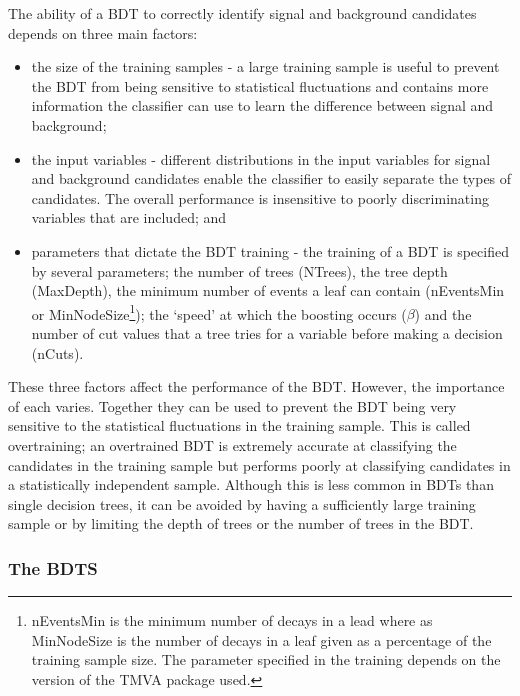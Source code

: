 The ability of a BDT to correctly identify signal and background candidates depends on three main factors:
\begin{itemize}
\item the size of the training samples - a large training sample is useful to prevent the BDT from being sensitive to statistical fluctuations and contains more information the classifier can use to learn the difference between signal and background;
\item the input variables - different distributions in the input variables for signal and background candidates enable the classifier to easily separate the types of candidates. The overall performance is insensitive to poorly discriminating variables that are included; and
\item parameters that dictate the BDT training - the training of a BDT is specified by several parameters; the number of trees (NTrees), the tree depth (MaxDepth), the minimum number of events a leaf can contain (nEventsMin or MinNodeSize\footnote{nEventsMin is the minimum number of decays in a lead where as MinNodeSize is the number of decays in a leaf given as a percentage of the training sample size. The parameter specified in the training depends on the version of the TMVA package used. }); the `speed’ at which the boosting occurs ($\beta$) and the number of cut values that a tree tries for a variable before making a decision (nCuts).
\end{itemize}

These three factors affect the performance of the BDT. However, the importance of each varies. Together they can be used to prevent the BDT being very sensitive to the statistical fluctuations in the training sample. This is called overtraining; an overtrained BDT is extremely accurate at classifying the candidates in the training sample but performs poorly at classifying candidates in a statistically independent sample. Although this is less common in BDTs than single decision trees, it can be avoided by having a sufficiently large training sample or by limiting the depth of trees or the number of trees in the BDT. 

\subsubsection{The BDTS}
\label{BDTS}

